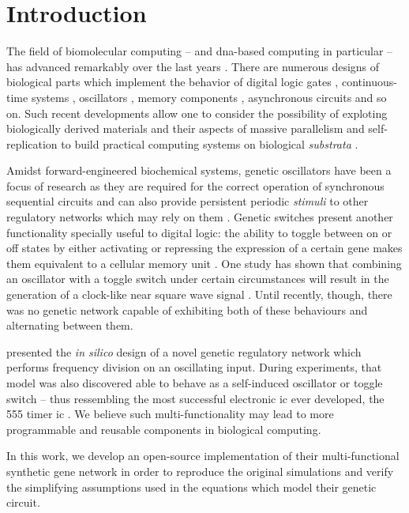 \section{Introduction}

  The field of biomolecular computing -- and \acs{dna}-based computing in particular -- has advanced remarkably over the last years \cite{history}.
  There are numerous designs of biological parts which implement the behavior of digital logic gates \cite{reconfgate}, continuous-time systems \cite{analog}, oscillators \cite{repressilator}, memory components \cite{register}, asynchronous circuits \cite{async} and so on.
  Such recent developments allow one to consider the possibility of exploting biologically derived materials and their aspects of massive parallelism and self-replication to build practical computing systems on biological \textit{substrata} \cite{youtuber}.

  Amidst forward-engineered biochemical systems, genetic oscillators have been a focus of research \cite{optoscillator} as they are required for the correct operation of synchronous sequential circuits and can also provide persistent periodic \textit{stimuli} to other regulatory networks which may rely on them \cite{bioapps}.
  Genetic switches present another functionality specially useful \cite{bioapps} to digital logic: the ability to toggle between on or off states by either activating or repressing the expression of a certain gene makes them equivalent to a cellular memory unit \cite{youtuber}.
  One study has shown that combining an oscillator with a toggle switch under certain circumstances will result in the generation of a clock-like near square wave signal \cite{clock}.
  Until recently, though, there was no genetic network capable of exhibiting both of these behaviours and alternating between them.

  \citet{multif} presented the \textit{in silico} design of a novel genetic regulatory network which performs frequency division on an oscillating input.
  During experiments, that model was also discovered able to behave as a self-induced oscillator or toggle switch -- thus ressembling the most successful electronic \ac{ic} ever developed, the 555 timer \acs{ic} \cite{ic555}.
  We believe such multi-functionality may lead to more programmable and reusable components in biological computing.

  In this work, we develop an open-source implementation of their multi-functional synthetic gene network in order to reproduce the original simulations and verify the simplifying assumptions used in the equations which model their genetic circuit.


